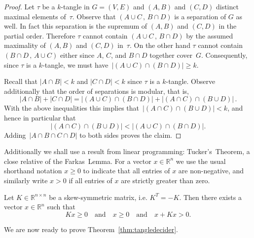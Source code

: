 \documentclass[11pt]{article}
\theoremstyle{definition}
\newcommand{\R}{\mathbb{R}}
\newcommand{\abs}[1]{\left |#1\right |}
\begin{document}
\begin{proof}
	Let $ \tau $ be a $ k $-tangle in $ G=(V,E) $ and $ (A,B) $ and $ (C,D) $ distinct maximal elements of~$ \tau $. Observe that $ (A\cup C\,,\,B\cap D) $ is a separation of $ G $ as well. In fact this separation is the supremum of $ (A,B) $ and $ (C,D) $ in the partial order. Therefore $ \tau $ cannot contain $ (A\cup C\,,\,B\cap D) $ by the assumed maximality of $ (A,B) $ and $ (C,D) $ in~$ \tau $. On the other hand $ \tau $ cannot contain $ (B\cap D\,,\,A\cup C) $ either since $ A $, $ C $, and $ B\cap D $ together cover~$ G $. Consequently, since $ \tau $ is a $ k $-tangle, we must have~$ \abs{(A\cup C)\cap(B\cap D)}\ge k $.
	
	Recall that $ \abs{A\cap B}<k $ and $ \abs{C\cap D}<k $ since $ \tau $ is a $ k $-tangle. Observe additionally that the order of separations is modular, that is,
	\[ \abs{A\cap B}+\abs{C\cap D}=\abs{(A\cup C)\cap(B\cap D)}+\abs{(A\cap C)\cap(B\cup D)}\,. \]	
        With the above inequalities this implies that~$ \abs{(A\cap C)\cap(B\cup D)}<k $, and hence in particular that \[ \abs{(A\cap C)\cap(B\cup D)}<\abs{(A\cup C)\cap(B\cap D)}. \] Adding~$ \abs{A\cap B\cap C\cap D} $ to both sides proves the claim. 
\end{proof}

Additionally we shall use a result from linear programming: Tucker's~Theorem, a close relative of the Farkas~Lemma.
For a vector $ x\in\R^n $ we use the usual shorthand notation $ x\ge 0 $ to indicate that all entries of $ x $ are non-negative, and similarly write $ x > 0 $ if all entries of $ x $ are strictly greater than zero.

\begin{LEM}\label{lem:tucker}
	Let $ K\in\R^{n\times n} $ be a skew-symmetric matrix, i.e. $ {K^T=-K} $. Then there exists a vector $ x\in\R^n $ such that
	\[ Kx\ge0 \quad \text{and}\quad x\ge 0 \quad \text{and}\quad x+Kx>0. \]
\end{LEM}

We are now ready to prove Theorem~\ref{thm:tangledecider}.
\end{document}
